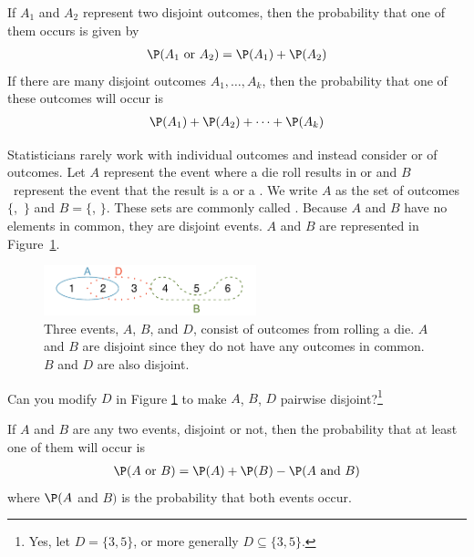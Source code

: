 	\begin{termBox}{ If $A_1$ and $A_2$ represent two disjoint outcomes, then the probability that one of them occurs is given by
	\begin{eqnarray*}
	\P(A_1\text{ or } A_2) = \P(A_1) + \P(A_2)
	\end{eqnarray*}
	If there are many disjoint outcomes $A_1,\dots,A_k$, then the probability that one of these outcomes will occur is
	\begin{eqnarray}
	\P(A_1) + \P(A_2) + \cdots + \P(A_k)
	\end{eqnarray}
	}
	\end{termBox}


	Statisticians rarely work with individual outcomes and instead consider  or  of outcomes. Let $A$ represent the event where a die roll results in  or  and $B$~represent the event that the result is a  or a . We write $A$ as the set of outcomes $\{$,~$\}$ and $B=\{$, $\}$. These sets are commonly called . Because $A$ and $B$ have no elements in common, they are disjoint events. $A$ and $B$ are represented in Figure~\ref{disjointSets}.

	\begin{figure}%
	\centering
	\includegraphics[width=0.55\textwidth]{ch_probability/figures/disjointSets/disjointSets}
	\caption{Three events, $A$, $B$, and $D$, consist of outcomes from rolling a die. $A$ and $B$ are disjoint since they do not have any outcomes in common. $B$ and $D$ are also disjoint.}
	\label{disjointSets}
	\end{figure}

	\begin{exercise}\label{lara}
	Can you modify $D$ in Figure \ref{disjointSets} to make $A$, $B$, $D$ pairwise disjoint?\footnote{Yes, let $D=\{3,5\}$, or more generally $D\subseteq\{3,5\}$.}
	\end{exercise}



	\begin{termBox}{ If $A$ and $B$ are any two events, disjoint or not, then the probability that at least one of them will occur is
	\begin{eqnarray}
	\P(A\text{ or }B) = \P(A) + \P(B) - \P(A\text{ and }B)
	\label{generalAdditionRule}
	\end{eqnarray}
	where $\P(A$ and $B)$ is the probability that both events occur.}
	\end{termBox}

